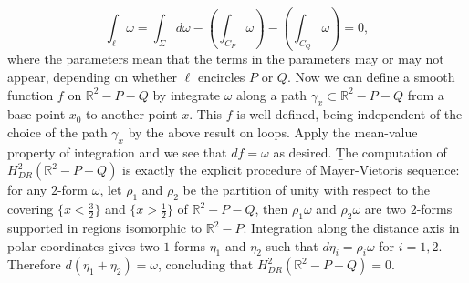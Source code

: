 \documentclass[12pt, a3paper, openany]{book}
\begin{document}
\begin{exercise}{}{}
\begin{Soln}
\[\int_\ell\omega=\int_\Sigma d\omega- \left(\int_{C_P}\omega\right) -\left(\int_{C_Q}\omega\right)= 0,\]
where the parameters mean that the terms in the parameters may or may not appear, depending on whether $\ell$ encircles $P$ or $Q$. Now we can define a smooth function $f$ on $\mathbb{R}^2-P-Q$ by integrate $\omega$ along a path $\gamma_x\subset \mathbb{R}^2-P-Q$ from a base-point $x_0$ to another point $x$. This $f$ is well-defined, being independent of the choice of the path $\gamma_x$ by the above result on loops. Apply the mean-value property of integration and we see that $df=\omega$ as desired.
\b
The computation of $H_{DR}^2(\mathbb{R}^2-P-Q)$ is exactly the explicit procedure of Mayer-Vietoris sequence: for any $2$-form $\omega$, let $\rho_1$ and $\rho_2$ be the partition of unity with respect to the covering $\{x<\frac{3}{2} \}$ and $\{x>\frac{1}{2}\}$ of $\mathbb{R}^2-P-Q $, then $\rho_1\omega$ and $\rho_2\omega$ are two $2$-forms supported in regions isomorphic to $\mathbb{R}^2-P$. Integration along the distance axis in polar coordinates gives two $1$-forms $\eta_1$ and $\eta_2$ such that $d\eta_i= \rho_i\omega$ for $i=1,2$. Therefore $d(\eta_1+\eta_2)=\omega$, concluding that $H_{DR}^2(\mathbb{R}^2-P-Q)=0$. 
\end{Soln}
\end{exercise}
\end{document}
